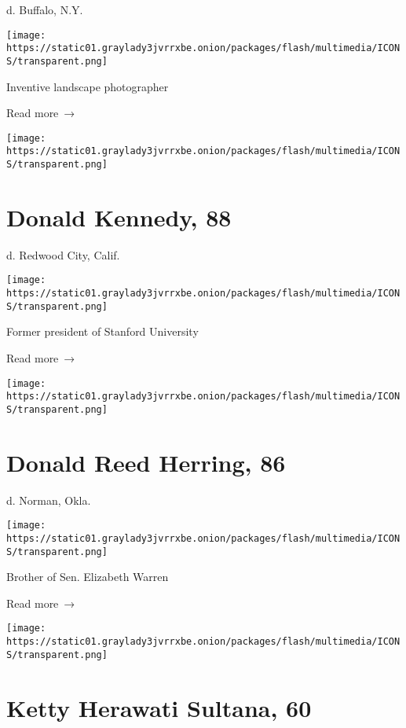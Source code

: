 d. Buffalo, N.Y.

\texttt{[image: https://static01.graylady3jvrrxbe.onion/packages/flash/multimedia/ICONS/transparent.png]}

Inventive landscape photographer

 Read more~→

\href{https://www.nytimes3xbfgragh.onion/2020/04/23/us/donald-kennedy-who-led-stanford-in-1980s-dies-at-88.html}{}

\texttt{[image: https://static01.graylady3jvrrxbe.onion/packages/flash/multimedia/ICONS/transparent.png]}

\hypertarget{donald-kennedy-88}{%
\section{Donald Kennedy, 88}\label{donald-kennedy-88}}

d. Redwood City, Calif.

\texttt{[image: https://static01.graylady3jvrrxbe.onion/packages/flash/multimedia/ICONS/transparent.png]}

Former president of Stanford University

 Read more~→

\href{https://www.nytimes3xbfgragh.onion/2020/04/23/us/politics/donald-herring-dead-coronavirus.html}{}

\texttt{[image: https://static01.graylady3jvrrxbe.onion/packages/flash/multimedia/ICONS/transparent.png]}

\hypertarget{donald-reed-herring-86}{%
\section{Donald Reed Herring, 86}\label{donald-reed-herring-86}}

d. Norman, Okla.

\texttt{[image: https://static01.graylady3jvrrxbe.onion/packages/flash/multimedia/ICONS/transparent.png]}

Brother of Sen. Elizabeth Warren

 Read more~→

\href{https://www.nytimes3xbfgragh.onion/2020/04/23/obituaries/ketty-herawati-sultana-coronavirus-dead.html}{}

\texttt{[image: https://static01.graylady3jvrrxbe.onion/packages/flash/multimedia/ICONS/transparent.png]}

\hypertarget{ketty-herawati-sultana-60}{%
\section{Ketty Herawati Sultana, 60}\label{ketty-herawati-sultana-60}}

